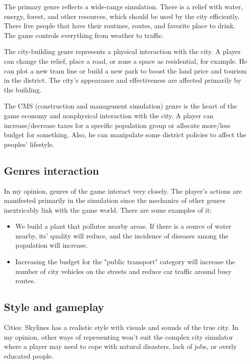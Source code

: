 \documentclass[a4paper,10pt, english]{article}
\begin{document}
The primary genre reflects a wide-range simulation. There is a relief with water, energy, forest, and other resources, which should be used by the city efficiently. There live people that have their routines, routes, and favorite place to drink. The game controls everything from weather to traffic.

The city-building genre represents a physical interaction with the city. A player can change the relief, place a road, or zone a space as residential, for example. He can plot a new tram line or build a new park to boost the land price and tourism in the district. The city's appearance and effectiveness are affected primarily by the building.

The CMS (construction and management simulation) genre is the heart of the game economy and nonphysical interaction with the city. A player can increase/decrease taxes for a specific population group or allocate more/less budget for something. Also, he can manipulate some district policies to affect the peoples' lifestyle.

\subsection*{Genres interaction}

In my opinion, genres of the game interact very closely. The player's actions are manifested primarily in the simulation since the mechanics of other genres inextricably link with the game world. There are some examples of it:

\begin{itemize}
    \item We build a plant that pollutes nearby areas. If there is a source of water nearby, its' quality will reduce, and the incidence of diseases among the population will increase.

    \item Increasing the budget for the "public transport" category will increase the number of city vehicles on the streets and reduce car traffic around busy routes.
\end{itemize}

\subsection*{Style and gameplay}
Cities: Skylines has a realistic style with visuals and sounds of the true city. In my opinion, other ways of representing won't suit the complex city simulator where a player may need to cope with natural disasters, lack of jobs, or overly educated people.
\end{document}
